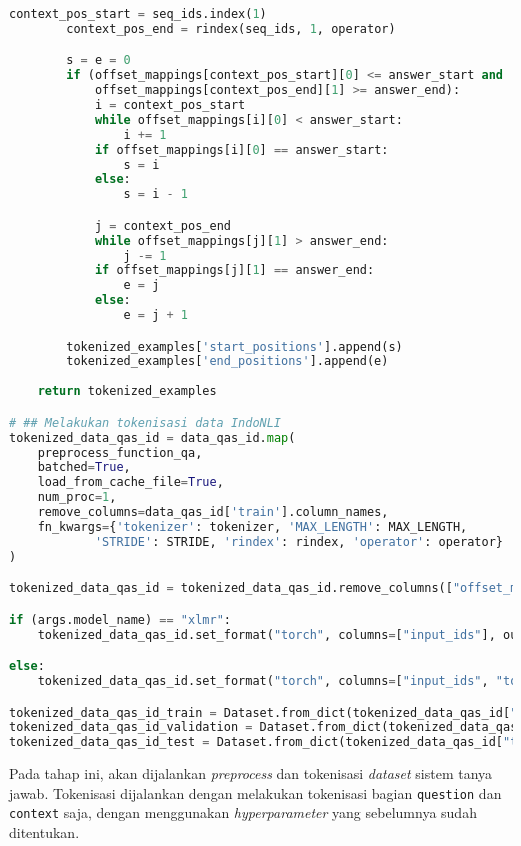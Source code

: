 \begin{lstlisting}[language=Python, caption=Proses \emph{preprocess} dan tokenisasi \emph{dataset} sistem tanya jawab]
        context_pos_start = seq_ids.index(1)
        context_pos_end = rindex(seq_ids, 1, operator)

        s = e = 0
        if (offset_mappings[context_pos_start][0] <= answer_start and 
            offset_mappings[context_pos_end][1] >= answer_end):
            i = context_pos_start
            while offset_mappings[i][0] < answer_start:
                i += 1
            if offset_mappings[i][0] == answer_start:
                s = i
            else:
                s = i - 1

            j = context_pos_end
            while offset_mappings[j][1] > answer_end:
                j -= 1      
            if offset_mappings[j][1] == answer_end:
                e = j
            else:
                e = j + 1

        tokenized_examples['start_positions'].append(s)
        tokenized_examples['end_positions'].append(e)
    
    return tokenized_examples

# ## Melakukan tokenisasi data IndoNLI
tokenized_data_qas_id = data_qas_id.map(
    preprocess_function_qa,
    batched=True,
    load_from_cache_file=True,
    num_proc=1,
    remove_columns=data_qas_id['train'].column_names,
    fn_kwargs={'tokenizer': tokenizer, 'MAX_LENGTH': MAX_LENGTH, 
            'STRIDE': STRIDE, 'rindex': rindex, 'operator': operator}
)

tokenized_data_qas_id = tokenized_data_qas_id.remove_columns(["offset_mapping", "overflow_to_sample_mapping"])

if (args.model_name) == "xlmr":
    tokenized_data_qas_id.set_format("torch", columns=["input_ids"], output_all_columns=True, device=device)

else:
    tokenized_data_qas_id.set_format("torch", columns=["input_ids", "token_type_ids"], output_all_columns=True, device=device)

tokenized_data_qas_id_train = Dataset.from_dict(tokenized_data_qas_id["train"][:SAMPLE])
tokenized_data_qas_id_validation = Dataset.from_dict(tokenized_data_qas_id["validation"][:SAMPLE])
tokenized_data_qas_id_test = Dataset.from_dict(tokenized_data_qas_id["test"][:SAMPLE])
\end{lstlisting}

Pada tahap ini, akan dijalankan  \emph{preprocess} dan tokenisasi \emph{dataset} sistem tanya jawab. Tokenisasi dijalankan dengan melakukan tokenisasi bagian \texttt{question} dan \texttt{context} saja, dengan menggunakan \emph{hyperparameter} yang sebelumnya sudah ditentukan.

